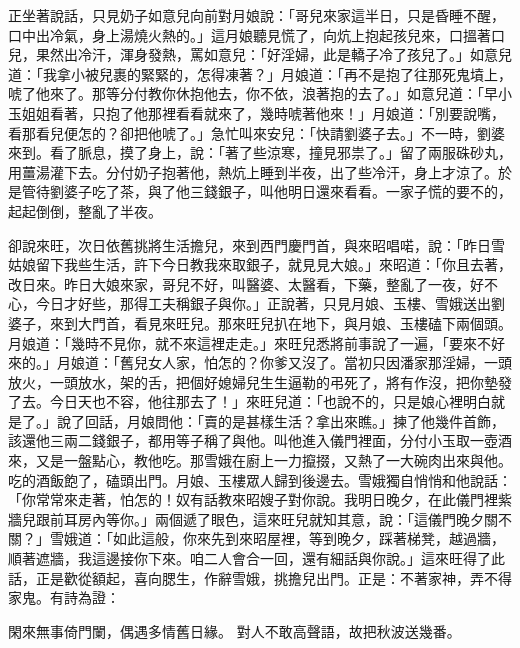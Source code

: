 正坐著說話，只見奶子如意兒向前對月娘說：「哥兒來家這半日，只是昏睡不醒，口中出冷氣，身上湯燒火熱的。」這月娘聽見慌了，向炕上抱起孩兒來，口搵著口兒，果然出冷汗，渾身發熱，罵如意兒：「好淫婦，此是轎子冷了孩兒了。」如意兒道：「我拿小被兒裹的緊緊的，怎得凍著？」月娘道：「再不是抱了往那死鬼墳上，唬了他來了。那等分付教你休抱他去，你不依，浪著抱的去了。」如意兒道：「早小玉姐姐看著，只抱了他那裡看看就來了，幾時唬著他來！」月娘道：「別要說嘴，看那看兒便怎的？卻把他唬了。」急忙叫來安兒：「快請劉婆子去。」不一時，劉婆來到。看了脈息，摸了身上，說：「著了些涼寒，撞見邪祟了。」留了兩服硃砂丸，用薑湯灌下去。分付奶子抱著他，熱炕上睡到半夜，出了些冷汗，身上才涼了。於是管待劉婆子吃了茶，與了他三錢銀子，叫他明日還來看看。一家子慌的要不的，起起倒倒，整亂了半夜。

卻說來旺，次日依舊挑將生活擔兒，來到西門慶門首，與來昭唱喏，說：「昨日雪姑娘留下我些生活，許下今日教我來取銀子，就見見大娘。」來昭道：「你且去著，改日來。昨日大娘來家，哥兒不好，叫醫婆、太醫看，下藥，整亂了一夜，好不心，今日才好些，那得工夫稱銀子與你。」正說著，只見月娘、玉樓、雪娥送出劉婆子，來到大門首，看見來旺兒。那來旺兒扒在地下，與月娘、玉樓磕下兩個頭。月娘道：「幾時不見你，就不來這裡走走。」來旺兒悉將前事說了一遍，「要來不好來的。」月娘道：「舊兒女人家，怕怎的？你爹又沒了。當初只因潘家那淫婦，一頭放火，一頭放水，架的舌，把個好媳婦兒生生逼勒的弔死了，將有作沒，把你墊發了去。今日天也不容，他往那去了！」來旺兒道：「也說不的，只是娘心裡明白就是了。」說了回話，月娘問他：「賣的是甚樣生活？拿出來瞧。」揀了他幾件首飾，該還他三兩二錢銀子，都用等子稱了與他。叫他進入儀門裡面，分付小玉取一壺酒來，又是一盤點心，教他吃。那雪娥在廚上一力攛掇，又熱了一大碗肉出來與他。吃的酒飯飽了，磕頭出門。月娘、玉樓眾人歸到後邊去。雪娥獨自悄悄和他說話：「你常常來走著，怕怎的！奴有話教來昭嫂子對你說。我明日晚夕，在此儀門裡紫牆兒跟前耳房內等你。」兩個遞了眼色，這來旺兒就知其意，說：「這儀門晚夕關不關？」雪娥道：「如此這般，你來先到來昭屋裡，等到晚夕，踩著梯凳，越過牆，順著遮牆，我這邊接你下來。咱二人會合一回，還有細話與你說。」這來旺得了此話，正是歡從額起，喜向腮生，作辭雪娥，挑擔兒出門。正是：不著家神，弄不得家鬼。有詩為證：

閑來無事倚門闌，偶遇多情舊日緣。
對人不敢高聲語，故把秋波送幾番。


